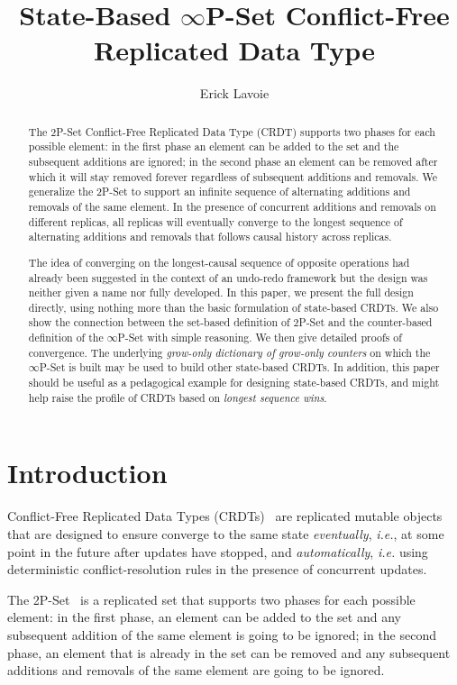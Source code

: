 \documentclass[10pt, oneside]{article}   	%
\title{State-Based $\infty$P-Set Conflict-Free Replicated Data Type}
\author{Erick Lavoie}
\begin{document}
\maketitle


\begin{abstract}
The 2P-Set Conflict-Free Replicated Data Type (CRDT) supports two phases for each possible element: in the first phase an element can be added to the set and the subsequent additions are ignored; in the second phase an element can be removed after which it will stay removed forever regardless of subsequent additions and removals. We generalize the 2P-Set to support an infinite sequence of alternating additions and removals of the same element. In the presence of concurrent additions and removals on different replicas, all replicas will eventually converge to the longest sequence of alternating additions and removals that follows causal history across replicas. 

The idea of converging on the longest-causal sequence of opposite operations had already been suggested in the context of an undo-redo framework but the design was neither given a name nor fully developed. In this paper, we present the full design directly, using nothing more than the basic formulation of state-based CRDTs. We also show the connection between the set-based definition of 2P-Set and the counter-based definition of the $\infty$P-Set with simple reasoning. We then give detailed proofs of convergence. The underlying \textit{grow-only dictionary of grow-only counters} on which the $\infty$P-Set is built may be used to build other state-based CRDTs. In addition, this paper should be useful as a pedagogical example for designing state-based CRDTs, and might help raise the profile of CRDTs based on \textit{longest sequence wins}.
\end{abstract}

\section{Introduction}

Conflict-Free Replicated Data Types (CRDTs)~\cite{shapiro:hal-00932836} are replicated mutable objects that are designed to ensure converge to the same state \textit{eventually}, \textit{i.e.}, at some point in the future after updates have stopped, and \textit{automatically}, \textit{i.e.} using deterministic conflict-resolution rules in the presence of concurrent updates. 

The 2P-Set~\cite{shapiro:inria-00555588} is a replicated set that supports two phases for each possible element: in the first phase, an element can be added to the set and any subsequent addition of the same element is going to be ignored; in the second phase, an element that is already in the set can be removed and any subsequent additions and removals of the same element are going to be ignored.
\end{document}
